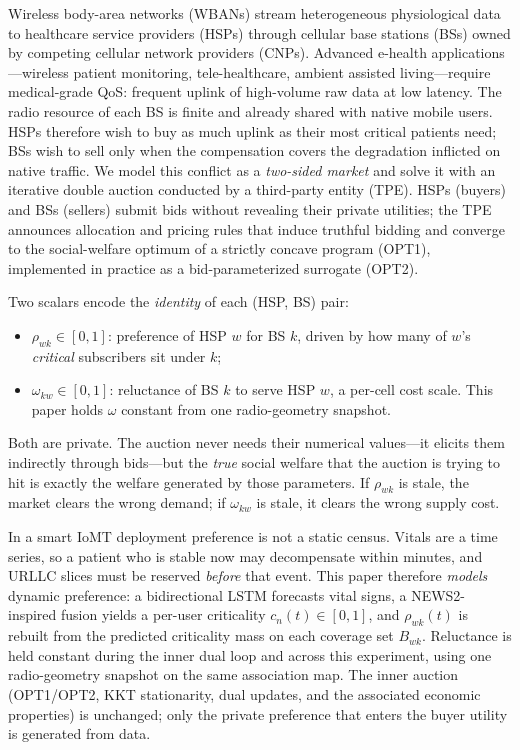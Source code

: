 \documentclass[journal,a4paper,10pt]{IEEEtran}
\begin{document}
Wireless body-area networks (WBANs) stream heterogeneous physiological data to healthcare service providers (HSPs) through cellular base stations (BSs) owned by competing cellular network providers (CNPs). Advanced e-health applications---wireless patient monitoring, tele-healthcare, ambient assisted living---require medical-grade QoS: frequent uplink of high-volume raw data at low latency. The radio resource of each BS is finite and already shared with native mobile users. HSPs therefore wish to buy as much uplink as their most critical patients need; BSs wish to sell only when the compensation covers the degradation inflicted on native traffic. We model this conflict as a \emph{two-sided market} and solve it with an iterative double auction conducted by a third-party entity (TPE). HSPs (buyers) and BSs (sellers) submit bids without revealing their private utilities; the TPE announces allocation and pricing rules that induce truthful bidding and converge to the social-welfare optimum of a strictly concave program (OPT1), implemented in practice as a bid-parameterized surrogate (OPT2).

Two scalars encode the \emph{identity} of each (HSP, BS) pair:
\begin{itemize}
  \item \(\rho_{wk}\in[0,1]\): preference of HSP \(w\) for BS \(k\), driven by how many of \(w\)'s \emph{critical} subscribers sit under \(k\);
  \item \(\omega_{kw}\in[0,1]\): reluctance of BS \(k\) to serve HSP \(w\), a per-cell cost scale. This paper holds \(\omega\) constant from one radio-geometry snapshot.
\end{itemize}
Both are private. The auction never needs their numerical values---it elicits them indirectly through bids---but the \emph{true} social welfare that the auction is trying to hit is exactly the welfare generated by those parameters. If \(\rho_{wk}\) is stale, the market clears the wrong demand; if \(\omega_{kw}\) is stale, it clears the wrong supply cost.

In a smart IoMT deployment preference is not a static census. Vitals are a time series, so a patient who is stable now may decompensate within minutes, and URLLC slices must be reserved \emph{before} that event. This paper therefore \emph{models} dynamic preference: a bidirectional LSTM forecasts vital signs, a NEWS2-inspired fusion yields a per-user criticality \(c_n(t)\in[0,1]\), and \(\rho_{wk}(t)\) is rebuilt from the predicted criticality mass on each coverage set \(B_{wk}\). Reluctance is held constant during the inner dual loop and across this experiment, using one radio-geometry snapshot on the same association map. The inner auction (OPT1/OPT2, KKT stationarity, dual updates, and the associated economic properties) is unchanged; only the private preference that enters the buyer utility is generated from data.
\end{document}
